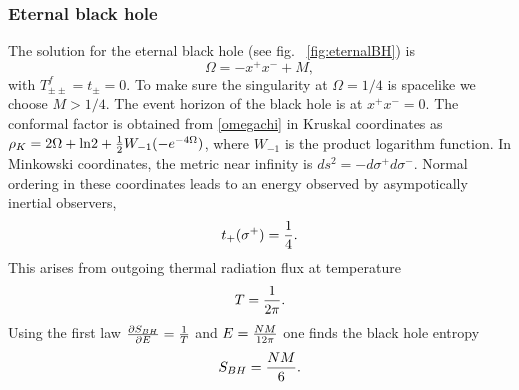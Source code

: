 \documentclass[12pt,oneside,letterpaper]{article}
\newcommand{\f}{\frac}
\newcommand{\be}{\begin{equation}}
\newcommand{\ee}{\end{equation}}
\def\be{\begin{eqnarray}}
\def\ee{\end{eqnarray}}
\let\s=\sigma \let\t=\tau \let\u=\upsilon \let\c=\chi
\let\f=\frac
\def\be{\begin{equation}}
\def\ee{\end{equation}}
\def\del{\partial}
\def\m{{M}}
\def\log{{\rm ln}}
\numberwithin{equation}{section}
\def \be {\begin{equation}}
\def \ee {\end{equation}}
\begin{document}
 \subsubsection{Eternal black hole}




The solution for the eternal black hole  (see fig. ~\ref{fig:eternalBH}) is
\be\label{eternalomega}
\Omega = - x^+ x^- + \m ,
\ee 
with  $T^{f}_{\pm \pm} =t_\pm =0$. To make sure the singularity at $\Omega = 1/4$ is spacelike we choose $\m > 1/4$. The event horizon of the black hole is at $x^+ x^- = 0$. The conformal factor is obtained from \eqref{omegachi} in Kruskal coordinates as $\rho_K = 2\Omega + \log 2 + \f 1 2 W_{-1}(-e^{-4\Omega})$, where $W_{-1}$ is the product logarithm function. In Minkowski coordinates, the metric near infinity is $ds^2 = -d\s^+ d\s^-$. Normal ordering in these coordinates leads to an energy observed by asympotically inertial observers,
\be\label{tyl} t_+(\s^+)={1 \over 4}.\ee
This arises from outgoing thermal radiation flux at temperature 
\be T={1 \over 2 \pi}.\ee
Using the first law ${\del S_{BH}\over \del E}={1 \over T}$ and $E={N\m \over 12\pi}$
one finds the black hole entropy
\be S_{BH}={N\m \over 6}.\ee
\end{document}
